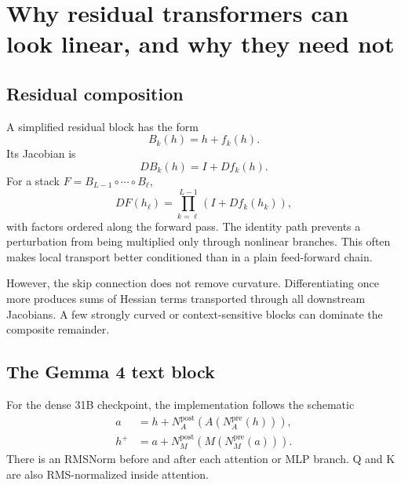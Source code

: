 \documentclass[11pt]{article}
\theoremstyle{definition}
\theoremstyle{remark}
\begin{document}
\section{Why residual transformers can look linear, and why they need not}

\subsection{Residual composition}
A simplified residual block has the form
\begin{equation}
  B_k(h)=h+f_k(h).
\end{equation}
Its Jacobian is
\begin{equation}
  DB_k(h)=I+Df_k(h).
\end{equation}
For a stack $F=B_{L-1}\circ\cdots\circ B_\ell$,
\begin{equation}
  DF(h_\ell)=\prod_{k=\ell}^{L-1}\left(I+Df_k(h_k)\right),
  \label{eq:residual_product}
\end{equation}
with factors ordered along the forward pass. The identity path prevents a perturbation from being multiplied only through nonlinear branches. This often makes local transport better conditioned than in a plain feed-forward chain.

However, the skip connection does not remove curvature. Differentiating once more produces sums of Hessian terms transported through all downstream Jacobians. A few strongly curved or context-sensitive blocks can dominate the composite remainder.

\subsection{The Gemma 4 text block}
For the dense 31B checkpoint, the implementation follows the schematic
\begin{align}
  a &= h + N^{\mathrm{post}}_{A}\!\left(
      A\left(N^{\mathrm{pre}}_{A}(h)\right)\right),
  \label{eq:gemma_attn_block}\\
  h^+ &= a + N^{\mathrm{post}}_{M}\!\left(
      M\left(N^{\mathrm{pre}}_{M}(a)\right)\right).
  \label{eq:gemma_mlp_block}
\end{align}
There is an RMSNorm before and after each attention or MLP branch. Q and K are also RMS-normalized inside attention.
\end{document}
